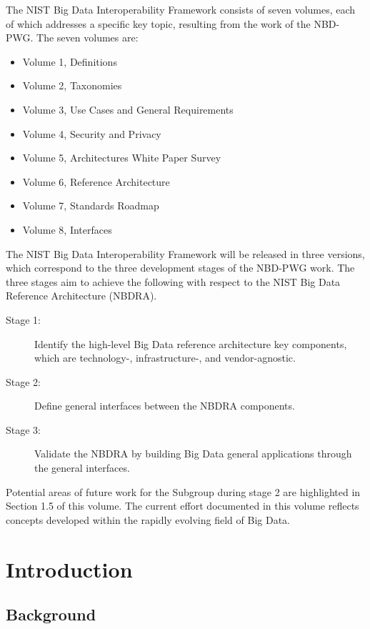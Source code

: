 \documentclass[11pt]{article}
\begin{document}
The NIST Big Data Interoperability Framework consists of seven volumes, each of which addresses a 
specific key topic, resulting from the work of the NBD-PWG. The seven volumes are:

\begin{itemize}
\item	Volume 1, Definitions
\item	Volume 2, Taxonomies 
\item	Volume 3, Use Cases and General Requirements
\item	Volume 4, Security and Privacy 
\item	Volume 5, Architectures White Paper Survey
\item	Volume 6, Reference Architecture
\item	Volume 7, Standards Roadmap
\item       Volume 8, Interfaces
\end{itemize}


The NIST Big Data Interoperability Framework will be released in three versions, which correspond to 
the three development stages of the NBD-PWG work. The three stages aim to achieve the following with 
respect to the NIST Big Data Reference Architecture (NBDRA).

\begin{description}
\item[Stage 1:]	 Identify the high-level Big Data reference architecture key components, which are 
technology-, infrastructure-, and vendor-agnostic.
\item[Stage 2:]	 Define general interfaces between the NBDRA components.
\item[Stage 3:]	 Validate the NBDRA by building Big Data general applications through the general 
interfaces.
\end{description}

Potential areas of future work for the Subgroup during stage 2 are highlighted in Section 1.5 of this 
volume. The current effort documented in this volume reflects concepts developed within the rapidly 
evolving field of Big Data.



\section{Introduction}

\subsection{Background}
\end{document}
